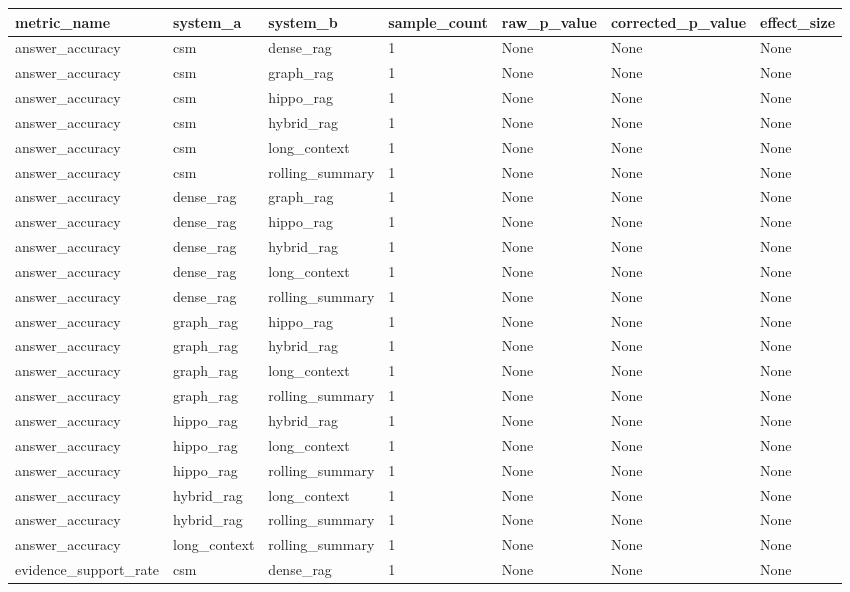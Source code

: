 \begin{tabular}{lllllll}
metric_name & system_a & system_b & sample_count & raw_p_value & corrected_p_value & effect_size \\
\hline
answer\_accuracy & csm & dense\_rag & 1 & None & None & None \\
answer\_accuracy & csm & graph\_rag & 1 & None & None & None \\
answer\_accuracy & csm & hippo\_rag & 1 & None & None & None \\
answer\_accuracy & csm & hybrid\_rag & 1 & None & None & None \\
answer\_accuracy & csm & long\_context & 1 & None & None & None \\
answer\_accuracy & csm & rolling\_summary & 1 & None & None & None \\
answer\_accuracy & dense\_rag & graph\_rag & 1 & None & None & None \\
answer\_accuracy & dense\_rag & hippo\_rag & 1 & None & None & None \\
answer\_accuracy & dense\_rag & hybrid\_rag & 1 & None & None & None \\
answer\_accuracy & dense\_rag & long\_context & 1 & None & None & None \\
answer\_accuracy & dense\_rag & rolling\_summary & 1 & None & None & None \\
answer\_accuracy & graph\_rag & hippo\_rag & 1 & None & None & None \\
answer\_accuracy & graph\_rag & hybrid\_rag & 1 & None & None & None \\
answer\_accuracy & graph\_rag & long\_context & 1 & None & None & None \\
answer\_accuracy & graph\_rag & rolling\_summary & 1 & None & None & None \\
answer\_accuracy & hippo\_rag & hybrid\_rag & 1 & None & None & None \\
answer\_accuracy & hippo\_rag & long\_context & 1 & None & None & None \\
answer\_accuracy & hippo\_rag & rolling\_summary & 1 & None & None & None \\
answer\_accuracy & hybrid\_rag & long\_context & 1 & None & None & None \\
answer\_accuracy & hybrid\_rag & rolling\_summary & 1 & None & None & None \\
answer\_accuracy & long\_context & rolling\_summary & 1 & None & None & None \\
evidence\_support\_rate & csm & dense\_rag & 1 & None & None & None \\

\end{tabular}
